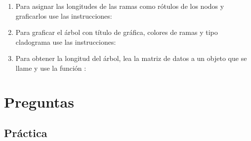 \begin{enumerate}
\begin{enumerate}
		\item Para asignar las longitudes de las ramas como r\'otulos de los nodos y graficarlos use las instrucciones:


		\item Para graficar el \'arbol con t\'itulo de gr\'afica, colores de ramas y tipo cladograma use las instrucciones:


		\item Para obtener la longitud del \'arbol, lea la matriz de datos  a un objeto que se llame  y use la funci\'on :


	\end{enumerate}	


\end{enumerate}


\section*{Preguntas}

\subsection*{Pr\'actica}


